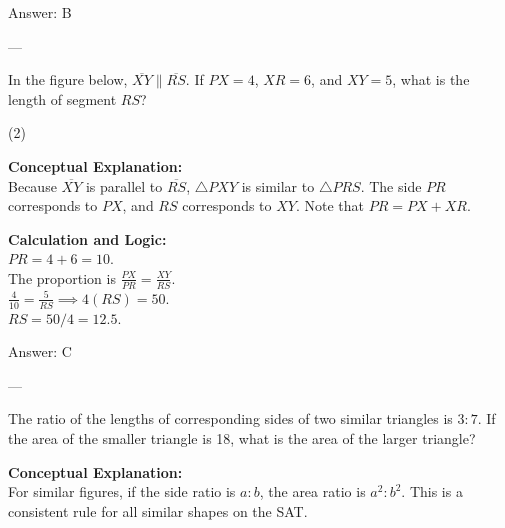 \documentclass[11pt,paper=a4,answers]{exam}
\begin{document}
\begin{questions}
\begin{solution}
\vspace{15pt}
Answer: \colorbox{yellow!100}{B}
\end{solution}

---

\question
In the figure below, $\overline{XY} \parallel \overline{RS}$. If $PX = 4$, $XR = 6$, and $XY = 5$, what is the length of segment $RS$?
\begin{center}
\end{center}
\begin{tasks}(2)
\end{tasks}

\begin{solution}
\textbf{Conceptual Explanation:} \\
Because $\overline{XY}$ is parallel to $\overline{RS}$, $\triangle PXY$ is similar to $\triangle PRS$. The side $PR$ corresponds to $PX$, and $RS$ corresponds to $XY$. Note that $PR = PX + XR$.

\vspace{10pt}
\textbf{Calculation and Logic:} \\
$PR = 4 + 6 = 10$. \\
The proportion is $\frac{PX}{PR} = \frac{XY}{RS}$. \\
$\frac{4}{10} = \frac{5}{RS} \implies 4(RS) = 50$. \\
$RS = 50 / 4 = 12.5$.

\vspace{15pt}
Answer: \colorbox{yellow!100}{C}
\end{solution}

---

\question
The ratio of the lengths of corresponding sides of two similar triangles is $3:7$. If the area of the smaller triangle is 18, what is the area of the larger triangle?

\begin{solution}
\textbf{Conceptual Explanation:} \\
For similar figures, if the side ratio is $a:b$, the area ratio is $a^2:b^2$. This is a consistent rule for all similar shapes on the SAT.


\end{solution}
\end{questions}
\end{document}
